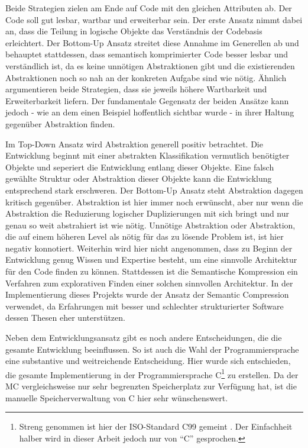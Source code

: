 Beide Strategien zielen am Ende auf Code mit den gleichen Attributen ab.
Der Code soll gut lesbar, wartbar und erweiterbar sein.
Der erste Ansatz nimmt dabei an, dass die Teilung in logische Objekte das Verständnis der Codebasis erleichtert.
Der Bottom-Up Ansatz streitet diese Annahme im Generellen ab und behauptet stattdessen, dass semantisch komprimierter Code besser lesbar und verständlich ist, da es keine unnötigen Abstraktionen gibt und die existierenden Abstraktionen noch so nah an der konkreten Aufgabe sind wie nötig.
Ähnlich argumentieren beide Strategien, dass sie jeweils höhere Wartbarkeit und Erweiterbarkeit liefern.
Der fundamentale Gegensatz der beiden Ansätze kann jedoch - wie an dem einen Beispiel hoffentlich sichtbar wurde - in ihrer Haltung gegenüber Abstraktion finden.

Im Top-Down Ansatz wird Abstraktion generell positiv betrachtet.
Die Entwicklung beginnt mit einer abstrakten Klassifikation vermutlich benötigter Objekte und seperiert die Entwicklung entlang dieser Objekte.
Eine falsch gewählte Struktur oder Abstraktion dieser Objekte kann die Entwicklung entsprechend stark erschweren.
Der Bottom-Up Ansatz steht Abstraktion dagegen kritisch gegenüber.
Abstraktion ist hier immer noch erwünscht, aber nur wenn die Abstraktion die Reduzierung logischer Duplizierungen mit sich bringt und nur genau so weit abstrahiert ist wie nötig.
Unnötige Abstraktion oder Abstraktion, die auf einem höheren Level als nötig für das zu lösende Problem ist, ist hier negativ konnotiert.
Weiterhin wird hier nicht angenommen, dass zu Beginn der Entwicklung genug Wissen und Expertise besteht, um eine sinnvolle Architektur für den Code finden zu können.
Stattdessen ist die Semantische Kompression ein Verfahren zum explorativen Finden einer solchen sinnvollen Architektur.
In der Implementierung dieses Projekts wurde der Ansatz der Semantic Compression verwendet, da Erfahrungen mit besser und schlechter strukturierter Software dessen Thesen eher unterstützen.

Neben dem Entwicklungsansatz gibt es noch andere Entscheidungen, die die gesamte Entwicklung beeinflussen.
So ist auch die Wahl der Programmiersprache eine substantive und weitreichende Entscheidung.
Hier wurde sich entschieden, die gesamte Implementierung in der Programmiersprache C\footnote{Streng genommen ist hier der ISO-Standard C99 gemeint \cite*[siehe ][]{iso.c99}. Der Einfachheit halber wird in dieser Arbeit jedoch nur von \enquote{C} gesprochen.} zu erstellen.
Da der \ac{MC} vergleichsweise nur sehr begrenzten Speicherplatz zur Verfügung hat, ist die manuelle Speicherverwaltung von C hier sehr wünschenswert.

